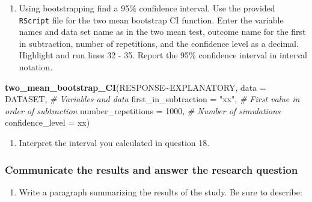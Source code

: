\documentclass[
]{report}
\newenvironment{Shaded}{\begin{snugshade}}{\end{snugshade}}
\newcommand{\CommentTok}[1]{\textcolor[rgb]{0.56,0.35,0.01}{\textit{#1}}}
\newcommand{\DataTypeTok}[1]{\textcolor[rgb]{0.13,0.29,0.53}{#1}}
\newcommand{\DecValTok}[1]{\textcolor[rgb]{0.00,0.00,0.81}{#1}}
\newcommand{\KeywordTok}[1]{\textcolor[rgb]{0.13,0.29,0.53}{\textbf{#1}}}
\newcommand{\NormalTok}[1]{#1}
\newcommand{\OperatorTok}[1]{\textcolor[rgb]{0.81,0.36,0.00}{\textbf{#1}}}
\newcommand{\StringTok}[1]{\textcolor[rgb]{0.31,0.60,0.02}{#1}}
\providecommand{\tightlist}{%
  \setlength{\itemsep}{0pt}\setlength{\parskip}{0pt}}
\begin{document}
\vspace{0.5in}

\begin{enumerate}
\def\labelenumi{\arabic{enumi}.}
\setcounter{enumi}{17}
\tightlist
\item
  Using bootstrapping find a 95\% confidence interval. Use the provided \texttt{RScript} file for the two mean bootstrap CI function. Enter the variable names and data set name as in the two mean test, outcome name for the first in subtraction, number of repetitions, and the confidence level as a decimal. Highlight and run lines 32 - 35. Report the 95\% confidence interval in interval notation.
\end{enumerate}

\begin{Shaded}
\begin{Highlighting}[]
\KeywordTok{two\_mean\_bootstrap\_CI}\NormalTok{(RESPONSE}\OperatorTok{\textasciitilde{}}\NormalTok{EXPLANATORY, }\DataTypeTok{data =}\NormalTok{ DATASET,  }\CommentTok{\# Variables and data}
                      \DataTypeTok{first\_in\_subtraction =} \StringTok{"xx"}\NormalTok{, }\CommentTok{\# First value in order of subtraction}
                      \DataTypeTok{number\_repetitions =} \DecValTok{1000}\NormalTok{,  }\CommentTok{\# Number of simulations}
                      \DataTypeTok{confidence\_level =}\NormalTok{ xx)}
\end{Highlighting}
\end{Shaded}

\vspace{0.3in}

\begin{enumerate}
\def\labelenumi{\arabic{enumi}.}
\setcounter{enumi}{18}
\tightlist
\item
  Interpret the interval you calculated in question 18.
\end{enumerate}

\vspace{1in}

\hypertarget{communicate-the-results-and-answer-the-research-question-2}{%
\subsubsection*{Communicate the results and answer the research question}\label{communicate-the-results-and-answer-the-research-question-2}}

\begin{enumerate}
\def\labelenumi{\arabic{enumi}.}
\setcounter{enumi}{19}
\tightlist
\item
  Write a paragraph summarizing the results of the study. Be sure to describe:
\end{enumerate}
\end{document}
